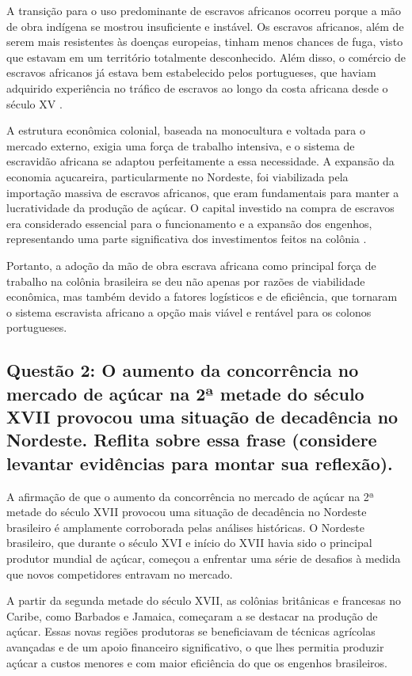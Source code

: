 \documentclass[a4paper,12pt]{article}[abntex2]
\begin{document}
A transição para o uso predominante de escravos africanos ocorreu porque a mão de obra indígena se mostrou insuficiente e instável. Os escravos africanos, além de serem mais resistentes às doenças europeias, tinham menos chances de fuga, visto que estavam em um território totalmente desconhecido. Além disso, o comércio de escravos africanos já estava bem estabelecido pelos portugueses, que haviam adquirido experiência no tráfico de escravos ao longo da costa africana desde o século XV .

A estrutura econômica colonial, baseada na monocultura e voltada para o mercado externo, exigia uma força de trabalho intensiva, e o sistema de escravidão africana se adaptou perfeitamente a essa necessidade. A expansão da economia açucareira, particularmente no Nordeste, foi viabilizada pela importação massiva de escravos africanos, que eram fundamentais para manter a lucratividade da produção de açúcar. O capital investido na compra de escravos era considerado essencial para o funcionamento e a expansão dos engenhos, representando uma parte significativa dos investimentos feitos na colônia .

Portanto, a adoção da mão de obra escrava africana como principal força de trabalho na colônia brasileira se deu não apenas por razões de viabilidade econômica, mas também devido a fatores logísticos e de eficiência, que tornaram o sistema escravista africano a opção mais viável e rentável para os colonos portugueses.

\subsection{\textbf{Questão 2: O aumento da concorrência no mercado de açúcar na 2ª metade do século XVII provocou uma situação de decadência no Nordeste. Reflita sobre essa frase (considere levantar evidências para montar sua reflexão).}}

A afirmação de que o aumento da concorrência no mercado de açúcar na 2ª metade do século XVII provocou uma situação de decadência no Nordeste brasileiro é amplamente corroborada pelas análises históricas. O Nordeste brasileiro, que durante o século XVI e início do XVII havia sido o principal produtor mundial de açúcar, começou a enfrentar uma série de desafios à medida que novos competidores entravam no mercado.

A partir da segunda metade do século XVII, as colônias britânicas e francesas no Caribe, como Barbados e Jamaica, começaram a se destacar na produção de açúcar. Essas novas regiões produtoras se beneficiavam de técnicas agrícolas avançadas e de um apoio financeiro significativo, o que lhes permitia produzir açúcar a custos menores e com maior eficiência do que os engenhos brasileiros.
\end{document}
